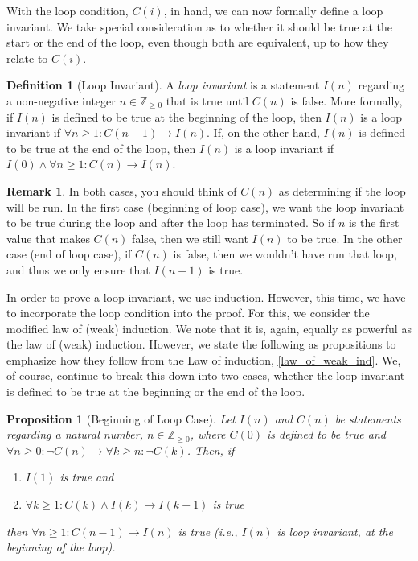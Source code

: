 \documentclass{article}
\newcommand{\ra}{\rightarrow}
\newcommand{\ZZ}{\mathbb{Z}_{\geq 0}}
\theoremstyle{plain}
\newtheorem{proposition}{Proposition}
\theoremstyle{definition}
\newtheorem{definition}{Definition}
\newtheorem{remark}{Remark}
\begin{document}
With the loop condition, \(C(i)\), in hand, we can now formally define a loop invariant. We take special consideration as to whether it should be true at the start or the end of the loop, even though both are equivalent, up to how they relate to \(C(i)\).

\begin{definition}[Loop Invariant]
    A \emph{loop invariant} is a statement \(I(n)\) regarding a non-negative integer \(n \in \ZZ\) that is true until \(C(n)\) is false. More formally, if \(I(n)\) is defined to be true at the beginning of the loop, then \(I(n)\) is a loop invariant if \(\forall n \geq 1 : C(n-1) \ra I(n)\). If, on the other hand, \(I(n)\) is defined to be true at the end of the loop, then \(I(n)\) is a loop invariant if \(I(0) \land \forall n \geq 1 : C(n) \ra I(n)\).
\end{definition}

\begin{remark}
    In both cases, you should think of \(C(n)\) as determining if the loop will be run. In the first case (beginning of loop case), we want the loop invariant to be true during the loop and after the loop has terminated. So if \(n\) is the first value that makes \(C(n)\) false, then we still want \(I(n)\) to be true. In the other case (end of loop case), if \(C(n)\) is false, then we wouldn't have run that loop, and thus we only ensure that \(I(n-1)\) is true. 
\end{remark}

In order to prove a loop invariant, we use induction. However, this time, we have to incorporate the loop condition into the proof. For this, we consider the modified law of (weak) induction. We note that it is, again, equally as powerful as the law of (weak) induction. However, we state the following as propositions to emphasize how they follow from the Law of induction, \cref{law_of_weak_ind}. We, of course, continue to break this down into two cases, whether the loop invariant is defined to be true at the beginning or the end of the loop.

\begin{proposition}[Beginning of Loop Case]\label{law_loop_inv_b}
    Let \(I(n)\) and \(C(n)\) be statements regarding a natural number, \(n \in \ZZ\), where \(C(0)\) is defined to be true and \(\forall n \geq 0: \lnot C(n) \ra \forall k \geq n : \lnot C(k)\). Then, if
    \begin{enumerate}
        \item \(I(1)\) is true and
        \item \(\forall k \geq 1 : C(k) \land I(k) \ra I(k+1)\) is true
    \end{enumerate}    
    then \(\forall n \geq 1 : C(n-1) \ra I(n)\) is true (i.e., \(I(n)\) is loop invariant, at the beginning of the loop).
\end{proposition}
\end{document}
